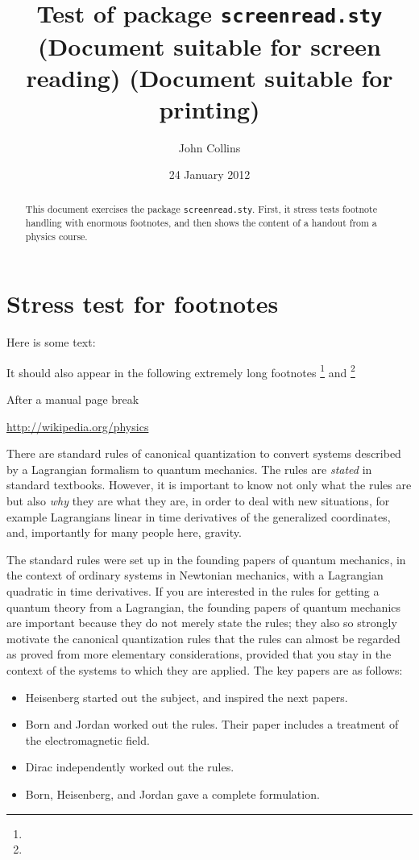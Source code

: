 \documentclass{article}
\title{Test of package \texttt{screenread.sty}
          \\
          \ifscreen
            (Document suitable for screen reading)
          \else
            (Document suitable for printing)
          \fi
   }
\author{John Collins}
\date{24 January 2012}
\begin{document}
\maketitle

\begin{abstract}
This document exercises the package \texttt{screenread.sty}.
First, it stress tests footnote handling with enormous footnotes, and
then shows the content of a handout from a physics course.
\end{abstract}

\section{Stress test for footnotes}

Here is some text:
\begin{quotation}
  \lipsum[6-20]
\end{quotation}
It should also appear in the following extremely long footnotes
\footnote{\lipsum[6-10]}
and
\footnote{\lipsum[11-20]}

\lipsum[1]

\pagebreak
After a manual page break
\lipsum[2]



\url{http://wikipedia.org/physics}

There are standard rules of canonical quantization to convert systems
described by a Lagrangian formalism to quantum mechanics.  The rules
are \emph{stated} in standard textbooks.  However, it is important to
know not only what the rules are but also \emph{why} they are what
they are, in order to deal with new situations, for example
Lagrangians linear in time derivatives of the generalized coordinates,
and, importantly for many people here, gravity.

The standard rules were set up in the founding papers of quantum
mechanics, in the context of ordinary systems in Newtonian mechanics,
with a Lagrangian quadratic in time derivatives.  If you are
interested in the rules for getting a quantum theory from a
Lagrangian, the founding papers of quantum mechanics 
are important because they do
not merely state the rules; they also so strongly motivate the canonical
quantization rules that the rules can almost be regarded as proved from
more elementary considerations, provided that you stay in the context
of the systems to which they are applied.  The key papers are as
follows:
\begin{itemize}
\item Heisenberg \cite{Heisenberg} started out the subject, and
  inspired the next papers.
\item Born and Jordan \cite{Born.Jordan} worked out the rules.  Their
  paper includes a treatment of the electromagnetic field.
\item Dirac \cite{Dirac} independently worked out the rules.
\item Born, Heisenberg, and Jordan \cite{Born.Heisenberg.Jordan} gave
  a complete formulation.
\end{itemize}
\end{document}
